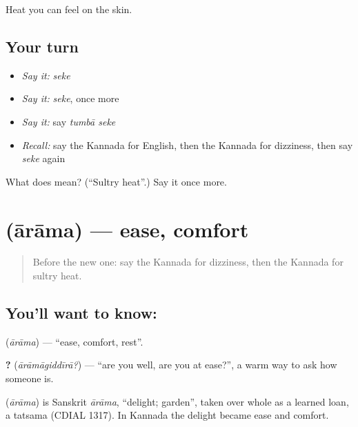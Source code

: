 \begin{grammarlens}[title={What you've built}]
Heat you can feel on the skin.
\end{grammarlens}

\subsection*{Your turn}
\begin{itemize}
\raggedright
  \item \emph{Say it:} \emph{seke}
  \item \emph{Say it:} \emph{seke}, once more
  \item \emph{Say it:} say \emph{tumbā seke}
  \item \emph{Recall:} say the Kannada for English, then the Kannada for dizziness, then say \emph{seke} again
\end{itemize}

\begin{tcolorbox}[breakable,colback=teal!4,colframe=teal!35!black,title={Before you move on}]
What does  mean? (\textquotedblleft{}Sultry heat\textquotedblright{}.) Say it once more.
\end{tcolorbox}
\section[\texorpdfstring{\kn{ಆರಾಮ} (ārāma)}{ಆರಾಮ (ārāma)}]{ (ārāma) — ease, comfort}

\label{lesson:KA-C93-ease}



\begin{quote}
Before the new one: say the Kannada for dizziness, then the Kannada for sultry heat.
\end{quote}

\subsection*{You'll want to know: }
\textbf{} (\emph{ārāma}) — \textquotedblleft{}ease, comfort, rest\textquotedblright{}.

\textbf{?} (\emph{ārāmāgiddīrā?}) — \textquotedblleft{}are you well, are you at ease?\textquotedblright{}, a warm way to ask how someone is.

\begin{cousinweb}
\textbf{} (\emph{ārāma}) is Sanskrit \emph{ārāma}, \textquotedblleft{}delight; garden\textquotedblright{}, taken over whole as a learned loan, a tatsama (CDIAL 1317). In Kannada the delight became ease and comfort.
\end{cousinweb}

